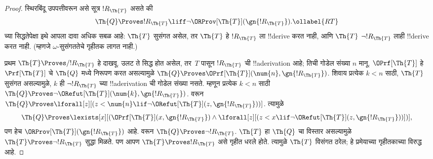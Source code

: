 \documentclass[../../../include/open-logic-section]{subfiles}
\begin{document}
\begin{proof}
स्थिरबिंदू उपपत्तीवरून
असे सूत्र $!R_\Th{T}$
असते की
\begin{equation}
  \Th{Q} \Proves !R_\Th{T} \liff \lnot \ORProv[\Th{T}](\gn{!R_\Th{T}}).
  \ollabel{RT}
\end{equation}
च्या सिद्धतेपेक्षा इथे
आपला दावा अधिक सबळ आहे:
$\Th{T}$ सुसंगत असेल,
तर $\Th{T}$ हे
$!R_\Th{T}$ ला !!{derive}
करत नाही, आणि $\Th{T}$
$\lnot !R_\Th{T}$ लाही
!!{derive} करत नाही.
(म्हणजे $\omega$-सुसंगततेचे
गृहीतक लागत नाही.)

प्रथम $\Th{T} \Proves/
!R_{\Th{T}}$ हे दाखवू.
उलट ते सिद्ध होत असेल,
तर~$T$ पासून
$!R_{\Th{T}}$ ची
!!a{derivation} आहे;
तिची गोडेल संख्या $n$
मानू. $\OPrf[\Th{T}]$
हे $\Prf[\Th{T}]$ चे
$\Th{Q}$ मध्ये निरूपण
करत असल्यामुळे
$\Th{Q} \Proves
\OPrf[\Th{T}](\num{n}, \gn{!R_{\Th{T}}})$.
शिवाय प्रत्येक $k < n$
साठी, $\Th{T}$ सुसंगत
असल्यामुळे, $k$ ही
$\lnot !R_{\Th{T}}$
च्या !!a{derivation} ची
गोडेल संख्या नसते.
म्हणून प्रत्येक $k < n$
साठी $\Th{Q} \Proves \lnot
\ORefut[\Th{T}](\num{k}, \gn{!R_{\Th{T}}})$.
वरून $\Th{Q} \Proves
\lforall[z][(z < \num{n} \lif \lnot \ORefut[\Th{T}](z,
  \gn{!R_{\Th{T}}}))]$.
त्यामुळे
\[
\Th{Q} \Proves \lexists[x][(\OPrf[\Th{T}](x,\gn{!R_{\Th{T}}}) \land \lforall[z][(z
    < x \lif \lnot \ORefut[\Th{T}](z,\gn{!R_{\Th{T}}}))])],
\]
पण हेच
$\ORProv[\Th{T}](\gn{!R_{\Th{T}}})$
आहे.  वरून
$\Th{Q}
\Proves \lnot !R_{\Th{T}}$.
$\Th{T}$ हा $\Th{Q}$ चा
विस्तार असल्यामुळे
$\Th{T}
\Proves \lnot !R_{\Th{T}}$
सुद्धा मिळते. पण आपण
$\Th{T} \Proves !R_{\Th{T}}$
असे गृहीत धरले होते.
त्यामुळे $\Th{T}$ विसंगत
ठरेल; हे प्रमेयाच्या
गृहीतकाच्या विरुद्ध आहे.


\end{proof}
\end{document}
